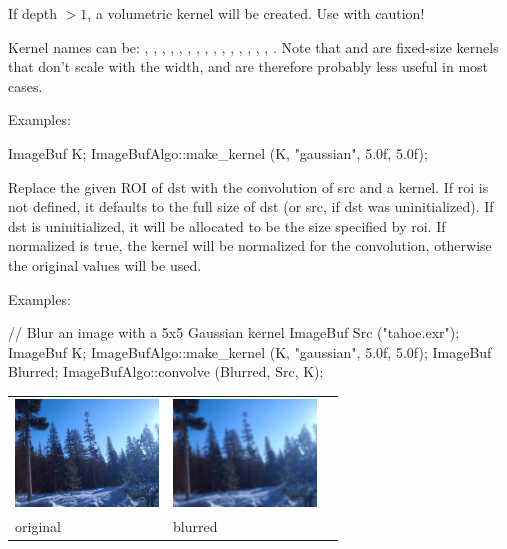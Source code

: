 If {\cf depth} $> 1$, a volumetric kernel will be created.  Use with
caution!

Kernel names can be: , , ,
, , , ,
, , , , ,
, , , . Note that
 and  are fixed-size kernels that don't
scale with the width, and are therefore probably less useful in most
cases.

\smallskip
\noindent Examples:
\begin{code}
    ImageBuf K;
    ImageBufAlgo::make_kernel (K, "gaussian", 5.0f, 5.0f);
\end{code}
\apiend

 
Replace the given ROI of {\cf dst} with the convolution of {\cf src} and
a kernel.  If {\cf roi} is not defined, it defaults to the full size
of {\cf dst} (or {\cf src}, if {\cf dst} was uninitialized).
If {\cf dst} is uninitialized,
it will be allocated to be the size specified by {\cf roi}.  If 
{\cf normalized} is {\cf true}, the kernel will be normalized for the 
convolution, otherwise the original values will be used.

\smallskip
\noindent Examples:
\begin{code}
    // Blur an image with a 5x5 Gaussian kernel
    ImageBuf Src ("tahoe.exr");
    ImageBuf K;
    ImageBufAlgo::make_kernel (K, "gaussian", 5.0f, 5.0f);
    ImageBuf Blurred;
    ImageBufAlgo::convolve (Blurred, Src, K);
\end{code}

\spc \begin{tabular}{lll}
\includegraphics[width=1.5in]{figures/tahoe-small.jpg} &
\includegraphics[width=1.5in]{figures/tahoe-blur.jpg} \\
original & blurred \\
\end{tabular}
\apiend

